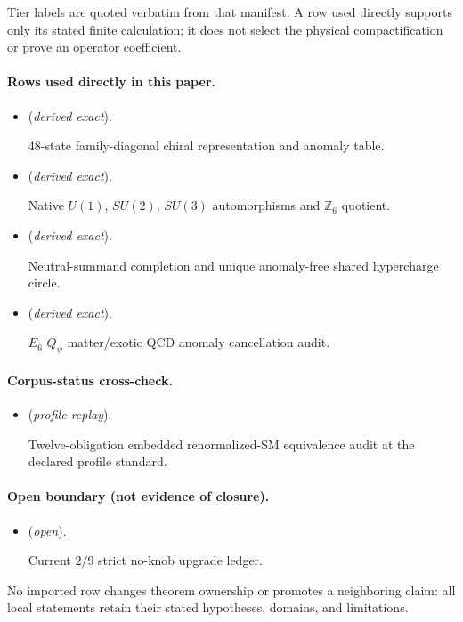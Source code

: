 \documentclass[11pt]{article}
\newcommand{\Z}{\mathbb{Z}}
\begin{document}
Tier labels are quoted verbatim from that manifest. A row used directly
supports only its stated finite calculation; it does not select the physical
compactification or prove an operator coefficient.

\paragraph{Rows used directly in this paper.}
\begin{itemize}
\setlength{\itemsep}{0.25em}
\item {}
(\emph{derived exact}).\par
48-state family-diagonal chiral representation and anomaly table.
\item {}
(\emph{derived exact}).\par
Native \(U(1)\), \(SU(2)\), \(SU(3)\) automorphisms and \(\Z_6\) quotient.
\item {}
(\emph{derived exact}).\par
Neutral-summand completion and unique anomaly-free shared hypercharge circle.
\item {}
(\emph{derived exact}).\par
\(E_6\) \(Q_\psi\) matter/exotic QCD anomaly cancellation audit.
\end{itemize}

\paragraph{Corpus-status cross-check.}
\begin{itemize}
\setlength{\itemsep}{0.25em}
\item {}
(\emph{profile replay}).\par
Twelve-obligation embedded renormalized-SM equivalence audit at the declared
profile standard.
\end{itemize}

\paragraph{Open boundary (not evidence of closure).}
\begin{itemize}
\setlength{\itemsep}{0.25em}
\item {}
(\emph{open}).\par
Current \(2/9\) strict no-knob upgrade ledger.
\end{itemize}

No imported row changes theorem ownership or promotes a neighboring claim:
all local statements retain their stated hypotheses, domains, and
limitations.



\end{document}
